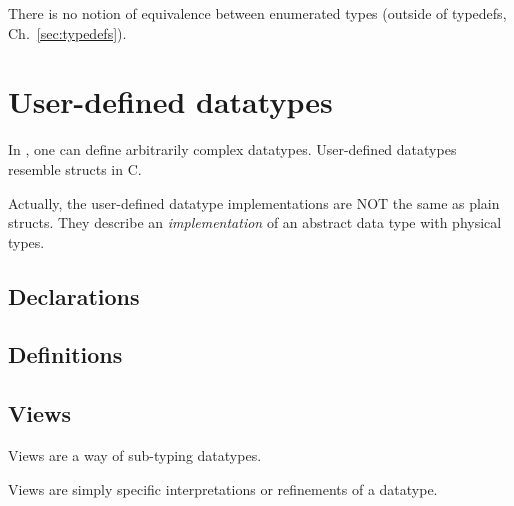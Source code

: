 There is no notion of equivalence between enumerated types 
(outside of typedefs, Ch.~\ref{sec:typedefs}).  

\section{User-defined datatypes}
\label{sec:datatype:userdef}

In \hac, one can define arbitrarily complex datatypes.  
User-defined datatypes resemble structs in C.  

Actually, the user-defined datatype implementations are
NOT the same as plain structs.  
They describe an \emph{implementation} of an abstract data type
with physical types.  

\subsection{Declarations}
\label{sec:datatype:userdef:declaration}

\subsection{Definitions}
\label{sec:datatype:userdef:definition}

\subsection{Views}
\label{sec:datatype:userdef:views}

Views are a way of sub-typing datatypes.  

Views are simply specific interpretations or refinements of a datatype.  




